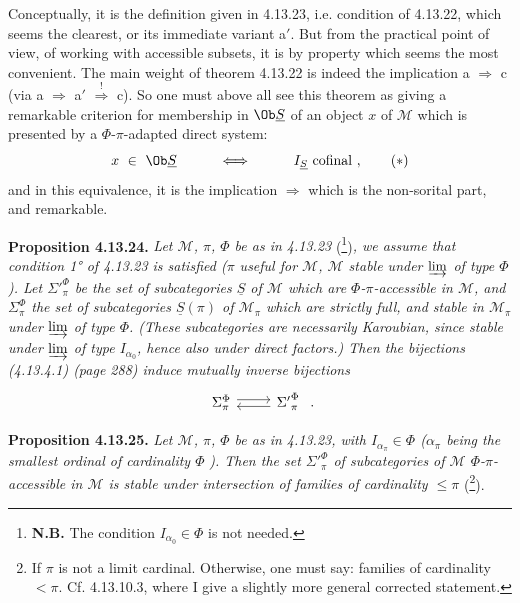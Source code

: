 Conceptually, it is the definition given in 4.13.23, i.e. condition  of 4.13.22, which seems the clearest, or its immediate variant a$'$. But from the practical point of view, of working with accessible subsets, it is by property  which seems the most convenient. The main weight of theorem 4.13.22 is indeed
the implication a $\Longrightarrow$ c (via a $\Longrightarrow$ a$'$ $\overset{!}{\Longrightarrow}$ c). So one must above all see this theorem as giving a remarkable criterion for membership in $\Ob\underline{S}$ of an object $x$ of $\mathcal{M}$ which is presented by a $\Phi$-$\pi$-adapted direct system:
\[ x\ \in\ \Ob\underline{S}\qquad\quad\Longleftrightarrow\qquad\quad I_{\underline{S}}\ \text{cofinal}\ , \tag*{$(*)$} \]
and in this equivalence, it is the implication $\Longrightarrow$ which is the non-sorital part, and remarkable.

\textbf{Proposition 4.13.24.} \textit{Let $\mathcal{M}$, $\pi$, $\Phi$ be as in 4.13.23} (\footnote{\textbf{N.B.} The condition $I_{\alpha_0}\in\Phi$ is not needed.})\textit{, we assume that condition 1° of 4.13.23 is satisfied ($\pi$ useful for $\mathcal{M}$, $\mathcal{M}$ stable under $\varinjlim$ of type $\Phi$). Let ${\Sigma'}^{\Phi}_{\pi}$ be the set of subcategories $\underline{S}$ of $\mathcal{M}$ which are $\Phi$-$\pi$-accessible in $\mathcal{M}$, and $\Sigma^{\Phi}_{\pi}$ the set of subcategories $\underline{S}(\pi)$ of $\mathcal{M}_\pi$ which are strictly full, and stable in $\mathcal{M}_\pi$ under $\varinjlim$ of type $\Phi$. (These subcategories are necessarily Karoubian, since stable under $\varinjlim$ of type $I_{\alpha_0}$, hence also under direct factors.) Then the bijections (4.13.4.1) (page 288) induce mutually inverse bijections}
\[
\begin{tikzcd}
\Sigma^{\Phi}_{\pi} \arrow[r, shift left] & {\Sigma'}^{\Phi}_{\pi} \arrow[l, shift left]
\end{tikzcd}\ .
\]

\textbf{Proposition 4.13.25.} \textit{Let $\mathcal{M}$, $\pi$, $\Phi$ be as in 4.13.23, with $I_{\alpha_\pi}\in\Phi$ ($\alpha_\pi$ being the smallest ordinal of cardinality $\Phi$} \textit{). Then the set ${\Sigma'}^{\Phi}_{\pi}$ of subcategories of $\mathcal{M}$ $\Phi$-$\pi$-accessible in $\mathcal{M}$ is stable under intersection of families of cardinality $\leqslant\pi$} (\footnote{If $\pi$ is not a limit cardinal. Otherwise, one must say: families of cardinality $<\pi$. Cf. 4.13.10.3, where I give a slightly more general corrected statement.}).

